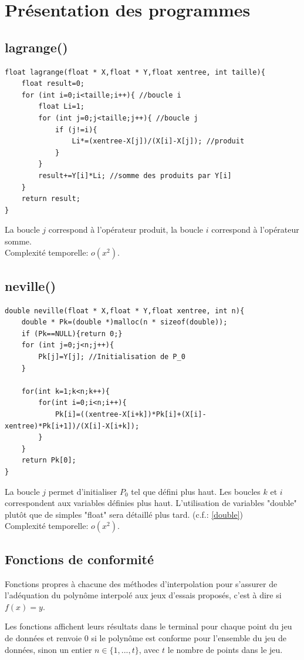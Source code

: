 \documentclass[10pt,a4paper,french]{article}
\begin{document}
\section{Présentation des programmes}
\subsection{lagrange()}
\begin{lstlisting}
float lagrange(float * X,float * Y,float xentree, int taille){
    float result=0;
    for (int i=0;i<taille;i++){ //boucle i
        float Li=1;
        for (int j=0;j<taille;j++){ //boucle j
            if (j!=i){
                Li*=(xentree-X[j])/(X[i]-X[j]); //produit
            }
        }  
        result+=Y[i]*Li; //somme des produits par Y[i]
    }
    return result;
}
\end{lstlisting}
La boucle $j$ correspond à l'opérateur produit, la boucle $i$ correspond à l'opérateur somme.\\
Complexité temporelle: $o(x^2)$.
\subsection{neville()}
\begin{lstlisting}
double neville(float * X,float * Y,float xentree, int n){
    double * Pk=(double *)malloc(n * sizeof(double));
    if (Pk==NULL){return 0;}
    for (int j=0;j<n;j++){
        Pk[j]=Y[j]; //Initialisation de P_0
    }

    for(int k=1;k<n;k++){
        for(int i=0;i<n;i++){
            Pk[i]=((xentree-X[i+k])*Pk[i]+(X[i]-xentree)*Pk[i+1])/(X[i]-X[i+k]);
        }
    }
    return Pk[0];
}

\end{lstlisting}
La boucle $j$ permet d'initialiser $P_0$ tel que défini plus haut. Les boucles $k$ et $i$ correspondent aux variables définies plus haut. L'utilisation de variables "double" plutôt que de simples "float" sera détaillé plus tard. (c.f.: \ref{double})\\
Complexité temporelle: $o(x^2)$.
\subsection{Fonctions de conformité}
Fonctions propres à chacune des méthodes d'interpolation pour s'assurer de l'adéquation du polynôme interpolé aux jeux d'essais proposés, c'est à dire si $f(x)=y$. 

Les fonctions affichent leurs résultats dans le terminal pour chaque point du jeu de données et renvoie 0 si le polynôme est conforme pour l'ensemble du jeu de données, sinon un entier $n\in \{1,...,t\}$, avec $t$ le nombre de points dans le jeu. 
\end{document}
